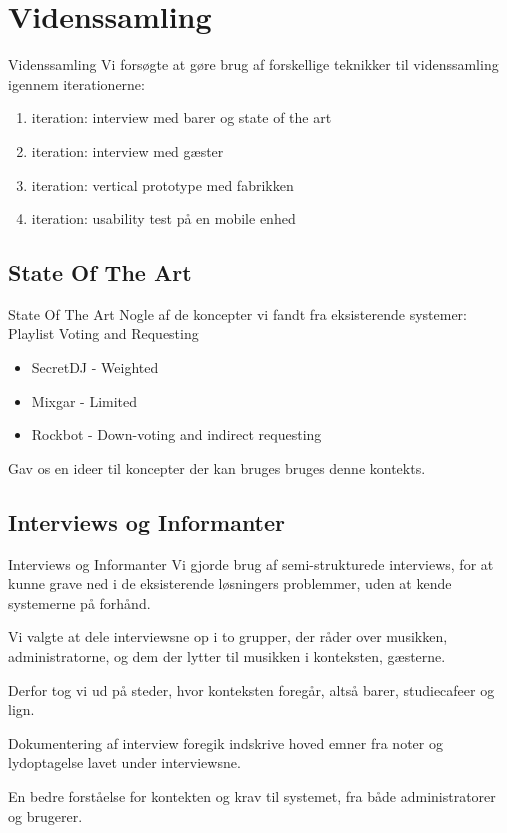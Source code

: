 \section{Videnssamling}
\begin{frame}{Videnssamling}
Vi forsøgte at gøre brug af forskellige teknikker til videnssamling igennem iterationerne:
\begin{enumerate}
\item iteration: interview med barer og state of the art
\item iteration: interview med gæster
\item iteration: vertical prototype med fabrikken
\item iteration: usability test på en mobile enhed
\end{enumerate}
\end{frame}

\subsection{State Of The Art}
\begin{frame}{State Of The Art}
	Nogle af de koncepter vi fandt fra eksisterende systemer:
	Playlist
	Voting and Requesting
	\begin{itemize}
	\item SecretDJ - Weighted
	\item Mixgar - Limited
	\item Rockbot - Down-voting and indirect requesting
	\end{itemize}

	Gav os en ideer til koncepter der kan bruges bruges denne kontekts.
\end{frame}
\subsection{Interviews og Informanter}
\begin{frame}{Interviews og Informanter}
	Vi gjorde brug af semi-strukturede interviews, for at kunne grave ned i de eksisterende løsningers problemmer, uden at kende systemerne på forhånd.

	Vi valgte at dele interviewsne op i to grupper, der råder over musikken, administratorne, og dem der lytter til musikken i konteksten, gæsterne.

	Derfor tog vi ud på steder, hvor konteksten foregår, altså barer, studiecafeer og lign.

	Dokumentering af interview foregik indskrive hoved emner fra noter og lydoptagelse lavet under interviewsne.

	En bedre forståelse for kontekten og krav til systemet, fra både administratorer og brugerer.
\end{frame}
